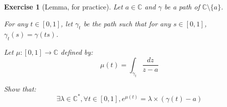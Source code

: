 \documentclass{article}
\newtheorem{exo}{Exercise}
\begin{document}
\begin{exo}[Lemma, for practice]
    Let $a\in\mathbb{C}$ and $\gamma$ be a path of $\mathbb{C} \setminus \lbrace a \rbrace$.

    For any $t\in[0,1]$, let $\gamma_t$ be the path such that for any $s\in[0,1]$, $\gamma_t(s) = \gamma(ts)$. 

    Let $\mu : [0,1] \rightarrow \mathbb{C}$ defined by:
    $$ \mu(t) = \int_{\gamma_t} \frac{dz}{z-a}$$ 

    Show that:
    $$\exists \lambda\in\mathbb{C}^*, \forall t \in [0,1], e^{\mu(t)} = \lambda \times (\gamma(t) -a) $$
\end{exo}
\end{document}
